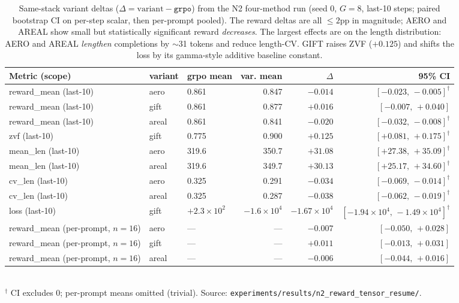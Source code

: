 \begin{table}[t]
\centering
\caption{Same-stack variant deltas ($\Delta = \text{variant} - \texttt{grpo}$)
from the N2 four-method run (seed $0$, $G{=}8$, last-10 steps; paired
bootstrap CI on per-step scalar, then per-prompt pooled). The reward
deltas are all $\leq 2$pp in magnitude; AERO and AREAL show small but
statistically significant reward \emph{decreases}. The largest effects
are on the length distribution: AERO and AREAL \emph{lengthen}
completions by $\sim$31 tokens and reduce length-CV. GIFT raises ZVF
($+0.125$) and shifts the loss by its gamma-style additive baseline
constant.}
\label{tab:p6-measured-deltas}
\small
\begin{tabular}{lllrrr}
\toprule
Metric (scope)        & variant & grpo mean & var. mean & $\Delta$ & 95\% CI \\
\midrule
reward\_mean (last-10) & aero    & 0.861 & 0.847 & $-0.014$  & $[-0.023,\,-0.005]^{\dagger}$ \\
reward\_mean (last-10) & gift    & 0.861 & 0.877 & $+0.016$  & $[-0.007,\,+0.040]$ \\
reward\_mean (last-10) & areal   & 0.861 & 0.841 & $-0.020$  & $[-0.032,\,-0.008]^{\dagger}$ \\
zvf (last-10)          & gift    & 0.775 & 0.900 & $+0.125$  & $[+0.081,\,+0.175]^{\dagger}$ \\
mean\_len (last-10)    & aero    & 319.6 & 350.7 & $+31.08$  & $[+27.38,\,+35.09]^{\dagger}$ \\
mean\_len (last-10)    & areal   & 319.6 & 349.7 & $+30.13$  & $[+25.17,\,+34.60]^{\dagger}$ \\
cv\_len (last-10)      & aero    & 0.325 & 0.291 & $-0.034$  & $[-0.069,\,-0.014]^{\dagger}$ \\
cv\_len (last-10)      & areal   & 0.325 & 0.287 & $-0.038$  & $[-0.062,\,-0.019]^{\dagger}$ \\
loss (last-10)         & gift    & $+2.3\!\times\!10^{2}$ & $-1.6\!\times\!10^{4}$ & $-1.67\!\times\!10^{4}$ & $[-1.94\!\times\!10^{4},\,-1.49\!\times\!10^{4}]^{\dagger}$ \\
\midrule
reward\_mean (per-prompt, $n{=}16$) & aero  & --- & --- & $-0.007$ & $[-0.050,\,+0.028]$ \\
reward\_mean (per-prompt, $n{=}16$) & gift  & --- & --- & $+0.011$ & $[-0.013,\,+0.031]$ \\
reward\_mean (per-prompt, $n{=}16$) & areal & --- & --- & $-0.006$ & $[-0.044,\,+0.016]$ \\
\bottomrule
\end{tabular}\\
\footnotesize{$^{\dagger}$ CI excludes $0$; per-prompt means omitted
(trivial). Source: \texttt{experiments/results/n2\_reward\_tensor\_resume/}.
}
\end{table}

